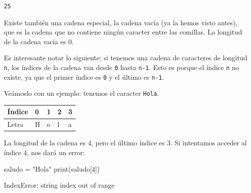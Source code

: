 \documentclass[
  letterpaper,
  DIV=11,
  numbers=noendperiod]{scrreprt}
\newenvironment{Shaded}{\begin{snugshade}}{\end{snugshade}}
\newcommand{\BuiltInTok}[1]{\textcolor[rgb]{0.00,0.23,0.31}{#1}}
\newcommand{\DecValTok}[1]{\textcolor[rgb]{0.68,0.00,0.00}{#1}}
\newcommand{\NormalTok}[1]{\textcolor[rgb]{0.00,0.23,0.31}{#1}}
\newcommand{\OperatorTok}[1]{\textcolor[rgb]{0.37,0.37,0.37}{#1}}
\newcommand{\StringTok}[1]{\textcolor[rgb]{0.13,0.47,0.30}{#1}}
\begin{document}
\begin{verbatim}
25
\end{verbatim}

Existe también una cadena especial, la cadena vacía (ya la hemos visto
antes), que es la cadena que no contiene ningún caracter entre las
comillas. La longitud de la cadena vacía es 0.

\begin{tcolorbox}[enhanced jigsaw, bottomrule=.15mm, leftrule=.75mm, opacityback=0, colback=white, toprule=.15mm, bottomtitle=1mm, opacitybacktitle=0.6, rightrule=.15mm, left=2mm, arc=.35mm, coltitle=black, title=\textcolor{quarto-callout-tip-color}{\faLightbulb}\hspace{0.5em}{Tip: Len e Índices de la Cadena}, breakable, toptitle=1mm, colframe=quarto-callout-tip-color-frame, titlerule=0mm, colbacktitle=quarto-callout-tip-color!10!white]

Es interesante notar lo siguiente: si tenemos una cadena de caracteres
de longitud \texttt{n}, los índices de la cadena van desde \texttt{0}
hasta \texttt{n-1}. Esto es porque el índice \texttt{n} no existe, ya
que el primer índice es \texttt{0} y el último es \texttt{n-1}.

Veámoslo con un ejemplo: tenemos el caracter \texttt{Hola}.

\begin{longtable}[]{@{}lllll@{}}
\toprule\noalign{}
Índice & 0 & 1 & 2 & 3 \\
\midrule\noalign{}
\endhead
\bottomrule\noalign{}
\endlastfoot
Letra & H & o & l & a \\
\end{longtable}

La longitud de la cadena es 4, pero el último índice es 3. Si intentamos
acceder al índice 4, nos dará un error:

\begin{Shaded}
\begin{Highlighting}[]
\NormalTok{saludo }\OperatorTok{=} \StringTok{"Hola"}
\BuiltInTok{print}\NormalTok{(saludo[}\DecValTok{4}\NormalTok{])}
\end{Highlighting}
\end{Shaded}

\begin{Shaded}
\begin{Highlighting}[]
\NormalTok{IndexError: string index out of range}
\end{Highlighting}
\end{Shaded}


\end{tcolorbox}
\end{document}
